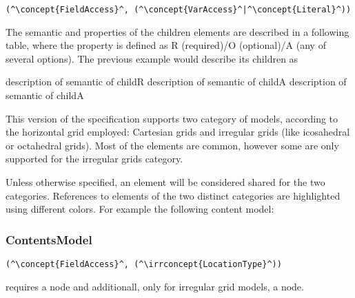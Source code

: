 \begin{lstlisting}[style=default,frame=none]
(^\concept{FieldAccess}^, (^\concept{VarAccess}^|^\concept{Literal}^))
\end{lstlisting}

The semantic and properties of the children elements are 
described in a following table, where the property is defined 
as R (required)/O (optional)/A (any of several options).
The previous example would describe its children as 

\begin{HIRChildElements}
	{description of semantic of child}{R}
	{description of semantic of child}{A}
	{description of semantic of child}{A}
\end{HIRChildElements}

This version of the specification supports two category of models, 
according to the horizontal grid employed: Cartesian grids and
irregular grids (like icosahedral or octahedral grids). 
Most of the elements are common, however some are only 
supported for the irregular grids category. 

Unless otherwise specified, an element will be considered 
shared for the two categories.
References to elements of the two distinct categories 
are highlighted using different colors. 
For example the following content model: 

\subsubsection*{ContentsModel}{}

\begin{lstlisting}[style=default,frame=none]
(^\concept{FieldAccess}^, (^\irrconcept{LocationType}^))
\end{lstlisting}

requires a  node and additionall, 
only for irregular grid models, a 
node.